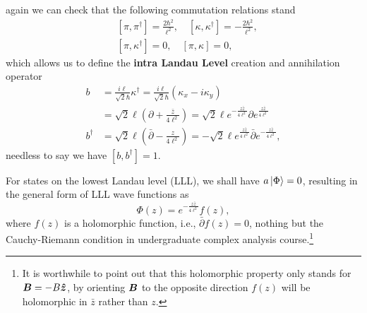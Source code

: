 \documentclass[%
nofootinbib,
 amsmath,amssymb,
 aps,onecolumn,
prb
]{revtex4-2}
\newcommand{\zz}{\bar{z}}
\newcommand{\overpartial}{\bar{\partial}}
\begin{document}
again we can check that the following commutation relations stand 
\begin{align}
    &[\pi,\pi^\dag]=\frac{2\hbar^2}{\ell^2},\quad[\kappa,\kappa^\dag]=-\frac{2\hbar^2}{\ell^2},\nonumber\\ 
    &[\pi,\kappa^\dag]=0,\quad [\pi,\kappa]=0,
\end{align} 
which allows us to define the \textbf{intra Landau Level} creation and annihilation operator
\begin{align}
    b&=\frac{i\ell}{\sqrt{2}\hbar}\kappa^\dag=\frac{i\ell}{\sqrt{2}\hbar}\left(\kappa_x-i\kappa_y\right)\nonumber\\ 
    &=\sqrt{2}\ell\left(\partial+\frac{\zz}{4\ell^2}\right)=\sqrt{2}\ell e^{-\frac{z\zz}{4\ell^2}}\partial e^{\frac{z\zz}{4\ell^2}}\nonumber\\ 
    b^\dag&=\sqrt{2}\ell\left(\overpartial-\frac{z}{4\ell^2}\right)=-\sqrt{2}\ell e^{\frac{z\zz}{4\ell^2}}\overpartial e^{-\frac{z\zz}{4\ell^2}},
\end{align}
needless to say we have $[b,b^\dag]=1$. \par 
For states on the lowest Landau level (LLL), we shall have $a\ket{\Phi}=0$, resulting in the general form of LLL wave functions as 
\begin{equation}
    \Phi\left(z\right)=e^{-\frac{z\zz}{4\ell^2}}f\left(z\right),
\end{equation}
where $f\left(z\right)$ is a holomorphic function, i.e., $\overpartial f\left(z\right)=0$, nothing but the Cauchy-Riemann condition in undergraduate complex analysis course.\footnote{It is worthwhile to point out that this holomorphic property only stands for $\vb*{B}=-B\vu*{z}$, by orienting $\vb*{B}$ to the opposite direction $f\left(z\right)$ will be holomorphic in $\zz$ rather than $z$.}
\end{document}
